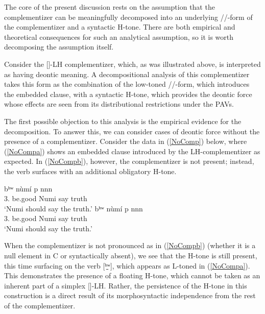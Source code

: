 \documentclass[output=paper,colorlinks,citecolor=brown]{langscibook}
\begin{document}
The core of the present discussion rests on the assumption that the complementizer can be meaningfully decomposed into an underlying /\mbuL/-form of the complementizer and a syntactic H-tone. There are both empirical and theoretical consequences for such an analytical assumption, so it is worth decomposing the assumption itself.

Consider the [\mbuLH]-LH complementizer, which, as was illustrated above, is interpreted as having deontic meaning. A decompositional analysis of this complementizer takes this form as the combination of the low-toned /\mbuL/-form, which introduces the embedded clause, with a syntactic H-tone, which provides the deontic force whose effects are seen from its distributional restrictions under the PAVs.

The first possible objection to this analysis is the empirical evidence for the decomposition. To answer this, we can consider cases of deontic force without the presence of a complementizer. Consider the data in (\ref{NoComp}) below, where (\ref{NoCompa}) shows an embedded clause introduced by the LH-complementizer as expected. In (\ref{NoCompb}), however, the complementizer is not present; instead, the verb surfaces with an additional obligatory H-tone.

\ea \label{NoComp}
    \begin{xlist}
    \ex \label{NoCompa}
         {bʰʷ\ooL} {\mbuLH} {n{ù}m{í}} {p} {n\baruH\ds n\baruH n\schwaH} \\
             {3.} {be.good} {} {Numi} {say} {truth} \\
        \glt `Numi should say the truth.'
    \ex \label{NoCompb}
         {bʰʷ\ooL\ooH} {n{ù}m{í}} {p} {n\baruH\ds n\baruH n\schwaH} \\
             {3.} {be.good} {Numi} {say} {truth} \\
        \glt `Numi should say the truth.'
    \end{xlist}
\z

When the complementizer is not pronounced as in (\ref{NoCompb}) (whether it is a null element in C or syntactically absent), we see that the H-tone is still present, this time surfacing on the verb [\b{ʰʷ}\ooL\ooH], which appears as L-toned in (\ref{NoCompa}). This demonstrates the presence of a floating H-tone, which cannot be taken as an inherent part of a simplex [\mbuLH]-LH. Rather, the persistence of the H-tone in this construction is a direct result of its morphosyntactic independence from the rest of the complementizer.
\end{document}
